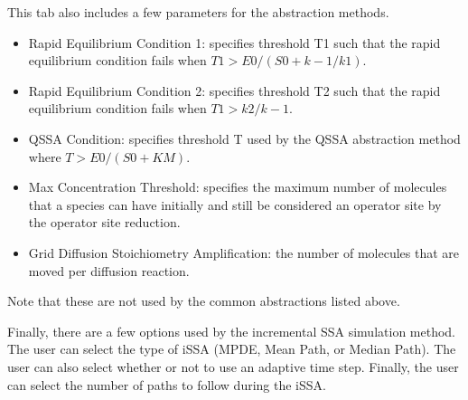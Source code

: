\documentclass[titlepage,11pt]{article}
\begin{document}
This tab also includes a few parameters for the abstraction methods.
\begin{itemize}
\item Rapid Equilibrium Condition 1: specifies threshold T1 such that the rapid equilibrium condition fails when $T1 > E0 / (S0 + k-1/k1)$.
\item Rapid Equilibrium Condition 2: specifies threshold T2 such that the rapid equilibrium condition fails when $T1 > k2 /k-1$.
\item QSSA Condition: specifies threshold T used by the QSSA abstraction method where $T > E0 / (S0 + KM)$.
\item Max Concentration Threshold: specifies the maximum number of molecules that a species can have initially and still be considered an operator site by the operator site reduction. 
\item Grid Diffusion Stoichiometry Amplification: the number of molecules that are moved per diffusion reaction. 
\end{itemize}
Note that these are not used by the common abstractions listed above.

Finally, there are a few options used by the incremental SSA simulation method.  The user can select the type of iSSA (MPDE, Mean Path, or Median Path).  The user can also select whether or not to use an adaptive time step.  Finally, the user can select the number of paths to follow during the iSSA.
\end{document}
